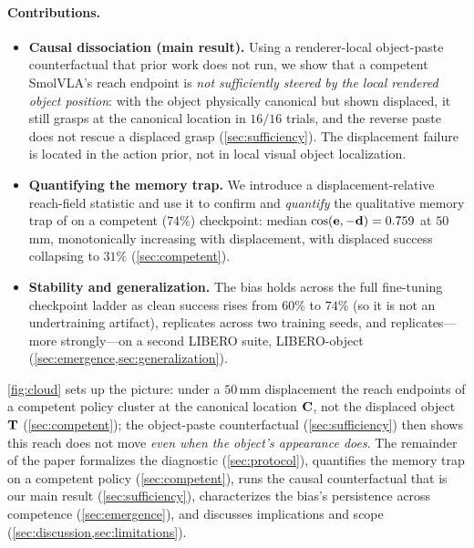 \paragraph{Contributions.}
\begin{itemize}
\item \textbf{Causal dissociation (main result).} Using a renderer-local object-paste counterfactual that prior work does not run, we show that a competent SmolVLA's reach endpoint is \emph{not sufficiently steered by the local rendered object position}: with the object physically canonical but shown displaced, it still grasps at the canonical location in $16/16$ trials, and the reverse paste does not rescue a displaced grasp (\cref{sec:sufficiency}). The displacement failure is located in the action prior, not in local visual object localization.
\item \textbf{Quantifying the memory trap.} We introduce a displacement-relative reach-field statistic and use it to confirm and \emph{quantify} the qualitative memory trap of \citet{afi2025memorytrap} on a competent ($74\%$) checkpoint: median $\operatorname{cos}(\mathbf{e},-\mathbf{d})=0.759$ at $50$\,mm, monotonically increasing with displacement, with displaced success collapsing to $31\%$ (\cref{sec:competent}).
\item \textbf{Stability and generalization.} The bias holds across the full fine-tuning checkpoint ladder as clean success rises from $60\%$ to $74\%$ (so it is not an undertraining artifact), replicates across two training seeds, and replicates---more strongly---on a second LIBERO suite, LIBERO-object (\cref{sec:emergence,sec:generalization}).
\end{itemize}

\cref{fig:cloud} sets up the picture: under a $50$\,mm displacement the reach endpoints of a competent policy cluster at the canonical location $\mathbf{C}$, not the displaced object $\mathbf{T}$ (\cref{sec:competent}); the object-paste counterfactual (\cref{sec:sufficiency}) then shows this reach does not move \emph{even when the object's appearance does}. The remainder of the paper formalizes the diagnostic (\cref{sec:protocol}), quantifies the memory trap on a competent policy (\cref{sec:competent}), runs the causal counterfactual that is our main result (\cref{sec:sufficiency}), characterizes the bias's persistence across competence (\cref{sec:emergence}), and discusses implications and scope (\cref{sec:discussion,sec:limitations}).
